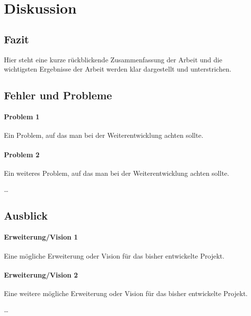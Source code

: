 

\section{Diskussion}


	\subsection{Fazit}
	
	Hier steht eine kurze rückblickende Zusammenfassung der Arbeit und die wichtigsten Ergebnisse der Arbeit werden klar dargestellt und unterstrichen.
	

	\subsection{Fehler und Probleme}
	
		\paragraph{Problem 1}
		Ein Problem, auf das man bei der Weiterentwicklung achten sollte.
		
		\paragraph{Problem 2} 
		Ein weiteres Problem, auf das man bei der Weiterentwicklung achten sollte.
		
		\dots
		
	
	
	\subsection{Ausblick}

		\paragraph{Erweiterung/Vision 1}
		Eine mögliche Erweiterung oder Vision für das bisher entwickelte Projekt.
		
		\paragraph{Erweiterung/Vision 2}
		Eine weitere mögliche Erweiterung oder Vision für das bisher entwickelte Projekt.
		
		\dots










	